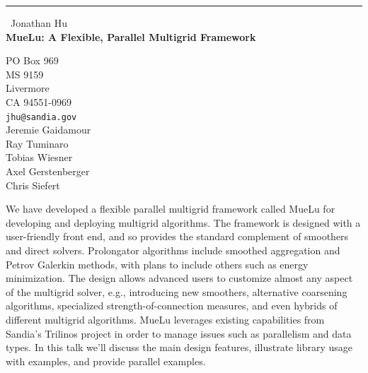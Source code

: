 \documentclass{report}
\begin{document}
\begin{center}
\rule{6in}{1pt} \
{\large Jonathan Hu \\
{\bf MueLu: A Flexible, Parallel Multigrid Framework}}

PO Box 969 \\ MS 9159 \\ Livermore \\ CA 94551-0969
\\
{\tt jhu@sandia.gov}\\
Jeremie Gaidamour\\
Ray Tuminaro\\
Tobias Wiesner\\
Axel Gerstenberger\\
Chris Siefert\end{center}

We have developed a flexible parallel multigrid framework called MueLu
for developing and deploying multigrid algorithms.
The framework is designed with a user-friendly front end, and so provides
the standard complement of smoothers and direct solvers.
Prolongator algorithms include smoothed aggregation and Petrov Galerkin
methods, with plans to include others such as energy
minimization.
The design allows advanced users to customize almost any aspect of the
multigrid solver, e.g., introducing new smoothers,
alternative coarsening algorithms, specialized strength-of-connection
measures, and even hybrids of different multigrid
algorithms. MueLu leverages existing capabilities from Sandia's Trilinos
project in order to manage issues such as parallelism and data types. In
this talk we'll discuss the main design features, illustrate library
usage with examples, and provide parallel examples.
\end{document}
